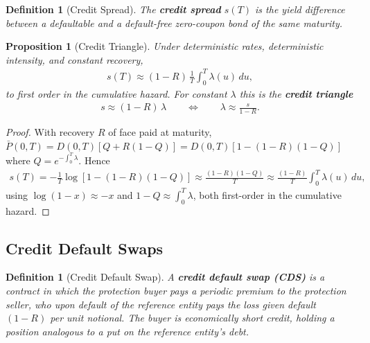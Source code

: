 \documentclass{report}
\theoremstyle{spacedplain}
\newtheorem{proposition}[theorem]{Proposition}
\theoremstyle{spaceddefinition}
\newtheorem{definition}[theorem]{Definition}
\theoremstyle{spacedremark}
\begin{document}
\begin{definition}[Credit Spread]
    The \textbf{credit spread} $s(T)$ is the yield difference between a defaultable and a default-free zero-coupon bond of the same maturity.
\end{definition}

\begin{proposition}[Credit Triangle]\label{prop:triangle}
    Under deterministic rates, deterministic intensity, and constant recovery,
    \begin{align}
        s(T) \approx (1-R)\,\frac{1}{T}\int_0^T \lambda(u)\,du,
    \end{align}
    to first order in the cumulative hazard. For constant $\lambda$ this is the \textbf{credit triangle}
    \begin{align}
        s \approx (1-R)\,\lambda \qquad\Longleftrightarrow\qquad \lambda \approx \frac{s}{1-R}.
    \end{align}
\end{proposition}
\begin{proof}
    With recovery $R$ of face paid at maturity, $\bar{P}(0,T) = D(0,T)\left[Q + R(1-Q)\right] = D(0,T)\left[1-(1-R)(1-Q)\right]$ where $Q = e^{-\int_0^T\lambda}$. Hence
    \begin{align}
        s(T) = -\frac{1}{T}\log\!\left[1-(1-R)(1-Q)\right] \approx \frac{(1-R)(1-Q)}{T} \approx \frac{(1-R)}{T}\int_0^T\lambda(u)\,du,
    \end{align}
    using $\log(1-x)\approx -x$ and $1-Q \approx \int_0^T\lambda$, both first-order in the cumulative hazard.
\end{proof}


\subsection{Credit Default Swaps}

\begin{definition}[Credit Default Swap]
    A \textbf{credit default swap (CDS)} is a contract in which the protection buyer pays a periodic premium to the protection seller, who upon default of the reference entity pays the loss given default $(1-R)$ per unit notional. The buyer is economically short credit, holding a position analogous to a put on the reference entity's debt.
\end{definition}
\end{document}

